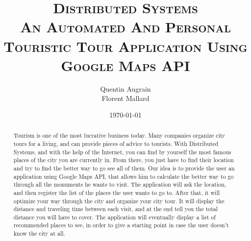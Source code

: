 \documentclass[a4paper]{article}
\title{
\textsc{Distributed Systems\\
\LARGE An Automated And Personal Touristic Tour Application Using Google Maps API }
}
\author
{
	Quentin {\sc Augrain}\\
    Florent {\sc Mallard}\\
}
\date{\today}
\begin{document}
\maketitle

\begin{abstract}
	Tourism is one of the most lucrative business today. Many companies organize city tours for a living, and can provide pieces of advice to tourists. With Distributed Systems, and with the help of the Internet, you can find by yourself the most famous places of the city you are currently in. From there, you just have to find their location and try to find the better way to go see all of them. Our idea is to provide the user an application using Google Maps API, that allows him to calculate the better way to go through all the monuments he wants to visit. The application will ask the location, and then register the list of the places the user wants to go to. After that, it will optimize your way through the city and organize your city tour. It will display the distance and traveling time between each visit, and at the end tell you the total distance you will have to cover. The application will eventually display a list of recommended places to see, in order to give a starting point in case the user doesn't know the city at all.
\end{abstract}
\end{document}
